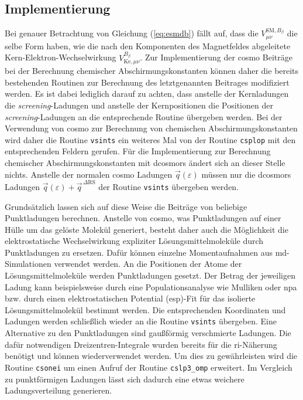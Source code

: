 	\subsection{Implementierung}\label{kap:cosmoimp}
	Bei genauer Betrachtung von Gleichung (\ref{eq:esmdb}) fällt auf, dass die $V_{\mu\nu}^{\textrm{SM},B_\beta}$ die selbe Form haben, wie die nach den Komponenten des Magnetfeldes abgeleitete Kern-Elektron-Wechselwirkung $V_{\textrm{Ke},\mu\nu}^{B_\beta}$. Zur Implementierung der \ac{cosmo} Beiträge bei der Berechnung chemischer Abschirmungskonstanten können daher die bereits bestehenden Routinen zur Berechnung des letztgenannten Beitrages modifiziert werden. Es ist dabei lediglich darauf zu achten, dass anstelle der Kernladungen die \textit{screening}-Ladungen und anstelle der Kernpositionen die Positionen der \textit{screening}-Ladungen an die entsprechende Routine übergeben werden. Bei der Verwendung von \ac{cosmo} zur Berechnung von chemischen Abschirmungskonstanten wird daher die Routine \texttt{vsints} ein weiteres Mal von der Routine \texttt{csplop} mit den entsprechenden Feldern gerufen. Für die Implementierung zur Berechnung chemischer Abschirmungskonstanten mit \ac{dcosmors} ändert sich an dieser Stelle nichts. Anstelle der normalen \ac{cosmo} Ladungen $\vec{q}(\varepsilon)$ müssen nur die \ac{dcosmors} Ladungen $\vec{q}(\varepsilon)+\vec{q}^{\,\Delta\textrm{RS}}$ der Routine \texttt{vsints} übergeben werden.
	
Grundsätzlich lassen sich auf diese Weise die Beiträge von beliebige Punktladungen berechnen. Anstelle von \ac{cosmo}, was Punktladungen auf einer Hülle um das gelöste Molekül generiert, besteht daher auch die Möglichkeit die elektrostatische Wechselwirkung expliziter Lösungsmittelmoleküle durch Punktladungen zu ersetzen. Dafür können einzelne Momentaufnahmen aus \ac{md}-Simulationen verwendet werden. An die Positionen der Atome der Lösungsmittelmoleküle werden Punktladungen gesetzt. Der Betrag der jeweiligen Ladung kann beispielsweise durch eine Populationsanalyse wie Mulliken\supercite{mulliken1955electronic} oder \ac{npa}\supercite{reed1985natural} bzw. durch einen elektrostatischen Potential (\acs{esp})-Fit\supercite{singh1984approach} für das isolierte Lösungsmittelmolekül bestimmt werden. Die entsprechenden Koordinaten und Ladungen werden schließlich wieder an die Routine \texttt{vsints} übergeben. Eine Alternative zu den Punktladungen sind gaußförmig verschmierte Ladungen. Die dafür notwendigen Dreizentren-Integrale wurden bereits für die \ac{ri}-Näherung benötigt und können wiederverwendet werden. Um dies zu gewährleisten wird die Routine \texttt{csonei} um einen Aufruf der Routine \texttt{cslp3\_omp} erweitert. Im Vergleich zu punktförmigen Ladungen lässt sich dadurch eine etwas weichere Ladungsverteilung generieren. 

